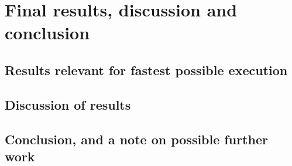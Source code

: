 
\section{Final results, discussion and conclusion} %
\label{sec:final_results_discussion_and_conclusion}

\subsection{Results relevant for fastest possible execution} %
\label{sub:results_relevant_for_fastest_possible_execution}


\subsection{Discussion of results} %
\label{sub:discussion_of_results}


\subsection{Conclusion, and a note on possible further work} %
\label{sub:conclusion_and_a_note_on_possible_further_work}

